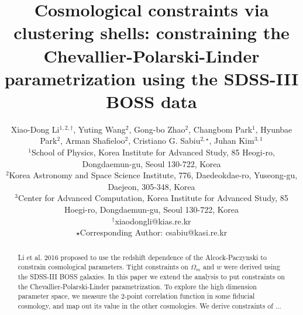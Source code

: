 \documentclass[useAMS,usenatbib]{mnras}
\begin{document}
\title[Constraining CPL via clustering shells of BOSS]{Cosmological constraints via clustering shells: 
constraining the Chevallier-Polarski-Linder parametrization using the SDSS-III BOSS data}

\author[Xiao-Dong~Li, Yuting Wang, Gong-bo Zhao, Changbom Park, Hyunbae Park, Cristiano G. Sabiu]
{ Xiao-Dong Li$^{1,2,\dagger}$,  Yuting Wang$^{2}$, Gong-bo Zhao$^{2}$, Changbom Park$^{1}$, Hyunbae Park$^{2}$, Arman Shafieloo$^{2}$,
Cristiano G. Sabiu$^{2,\star}$, Juhan Kim$^{3,1}$\\
$^1$School of Physics, Korea Institute for Advanced Study, 85 Heogi-ro, Dongdaemun-gu, Seoul 130-722, Korea\\
$^2$Korea Astronomy and Space Science Institute, 776, Daedeokdae-ro, Yuseong-gu, Daejeon, 305-348, Korea\\
$^3$Center for Advanced Computation, Korea Institute for Advanced Study, 85 Hoegi-ro, Dongdaemun-gu, Seoul 130-722, Korea\\
$^{\dagger}$xiaodongli@kias.re.kr\\
$\star$Corresponding Author: csabiu@kasi.re.kr}






\pagerange{\pageref{firstpage}--\pageref{lastpage}} 

\maketitle

\label{firstpage}

\begin{abstract}
Li et al. 2016 proposed to use the redshift dependence of the Alcock-Paczynski to constrain cosmological parameters.
Tight constraints on $\Omega_m$ and $w$ were derived using the SDSS-III BOSS galaxies.
In this paper we extend the analysis to put constraints on the Chevallier-Polarski-Linder parametrization.
To explore the high dimension parameter space, we measure the 2-point correlation function in some fiducial cosmology,
and map out its value in the other cosmologies.
We derive constraints of ...
\end{abstract}
\end{document}
